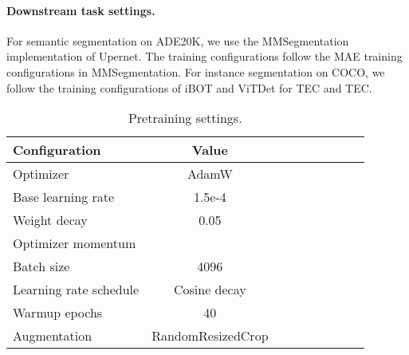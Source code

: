 \documentclass{article} \usepackage{iclr2023_conference,times}
\begin{document}
\paragraph{Downstream task settings.}
For semantic segmentation on ADE20K, 
we use the MMSegmentation~\citep{mmseg2020} implementation of Upernet.
The training configurations follow the MAE training configurations in MMSegmentation.
For instance segmentation on COCO,
we follow the training configurations of iBOT and ViTDet
for TEC and TEC.


\begin{table}[h]
	\centering
	\setlength{\tabcolsep}{8mm}
	\caption{Pretraining settings.
	}
	\small
	\begin{tabular}{lcccccccc}
		\toprule
        Configuration      & Value \\	\midrule
        Optimizer & AdamW  \\
        Base learning rate & 1.5e-4 \\
        Weight decay & 0.05 \\
        Optimizer momentum &   \\
        Batch size & 4096 \\
        Learning rate schedule & Cosine decay\\
        Warmup epochs  & 40 \\
        Augmentation & RandomResizedCrop \\
		\bottomrule
	\end{tabular}
	\label{tab:pretrain_weights}
\end{table}
\end{document}
